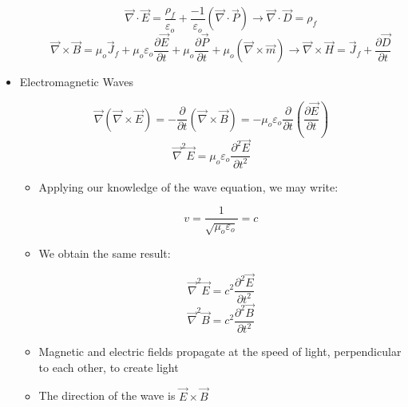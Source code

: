 \begin{itemize}
\begin{itemize}
        $$\vec{\nabla}\cdot\vec{E}=\frac{\rho_f}{\varepsilon_o}+\frac{-1}{\varepsilon_o}(\vec{\nabla}\cdot\vec{P})\rightarrow \vec{\nabla}\cdot\vec{D}=\rho_f$$
        $$\vec{\nabla}\times\vec{B}=\mu_o\vec{J}_f+\mu_o\varepsilon_o\frac{\partial\vec{E}}{\partial t}+\mu_o\frac{\partial\vec{P}}{\partial t}+\mu_o(\vec{\nabla}\times\vec{m})\rightarrow \vec{\nabla}\times\vec{H}=\vec{J}_f+\frac{\partial\vec{D}}{\partial t}$$

    \end{itemize}

  \item Electromagnetic Waves

    $$\vec{\nabla}(\vec{\nabla}\times\vec{E})=-\frac{\partial}{\partial t}(\vec{\nabla}\times\vec{B})=-\mu_o\varepsilon_o\frac{\partial}{\partial t}\left( \frac{\partial \vec{E}}{\partial t} \right)$$
    $$\vec{\nabla}^2\vec{E}=\mu_o\varepsilon_o\frac{\partial^2\vec{E}}{\partial t^2}$$

    \begin{itemize}

      \item Applying our knowledge of the wave equation, we may write:

        $$v=\frac{1}{\sqrt{\mu_o\varepsilon_o}}=c$$

      \item We obtain the same result:

        $$\vec{\nabla}^2\vec{E}=c^2\frac{\partial^2\vec{E}}{\partial t^2}$$
        $$\vec{\nabla}^2\vec{B}=c^2\frac{\partial^2\vec{B}}{\partial t^2}$$

      \item Magnetic and electric fields propagate at the speed of light, perpendicular to each other, to create light

      \item The direction of the wave is $\vec{E}\times\vec{B}$

    \end{itemize}

\end{itemize}




